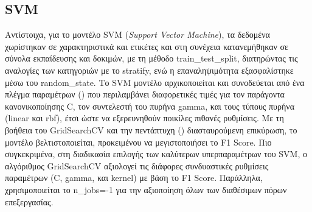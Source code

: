 \documentclass[diploma]{softlab-thesis}
\begin{document}
\begin{enumerate}
\begin{enumerate}

\subsection{SVM}

Αντίστοιχα, για το μοντέλο SVM (\textit{Support Vector Machine}), τα δεδομένα χωρίστηκαν σε χαρακτηριστικά και ετικέτες και στη συνέχεια κατανεμήθηκαν σε σύνολα εκπαίδευσης και δοκιμών, με τη μέθοδο train\_test\_split, διατηρώντας τις αναλογίες των κατηγοριών με το stratify, ενώ η επαναληψιμότητα εξασφαλίστηκε μέσω του random\_state. Το SVM μοντέλο αρχικοποιείται και συνοδεύεται από ένα πλέγμα παραμέτρων () που περιλαμβάνει διαφορετικές τιμές για τον παράγοντα κανονικοποίησης C, τον συντελεστή του πυρήνα gamma, και τους τύπους πυρήνα (linear και rbf), έτσι ώστε να εξερευνηθούν ποικίλες πιθανές ρυθμίσεις. Με τη βοήθεια του GridSearchCV και την πεντάπτυχη () διασταυρούμενη επικύρωση, το μοντέλο βελτιστοποιείται, προκειμένου να μεγιστοποιήσει το F1 Score. Πιο συγκεκριμένα, στη διαδικασία επιλογής των καλύτερων υπερπαραμέτρων του SVM, ο αλγόριθμος GridSearchCV αξιολογεί τις διάφορες συνδυαστικές ρυθμίσεις παραμέτρων (C, gamma, και kernel) με βάση το F1 Score. Παράλληλα, χρησιμοποιείται το n\_jobs=-1 για την αξιοποίηση όλων των διαθέσιμων πόρων επεξεργασίας. 



\end{enumerate}
\end{enumerate}
\end{document}
